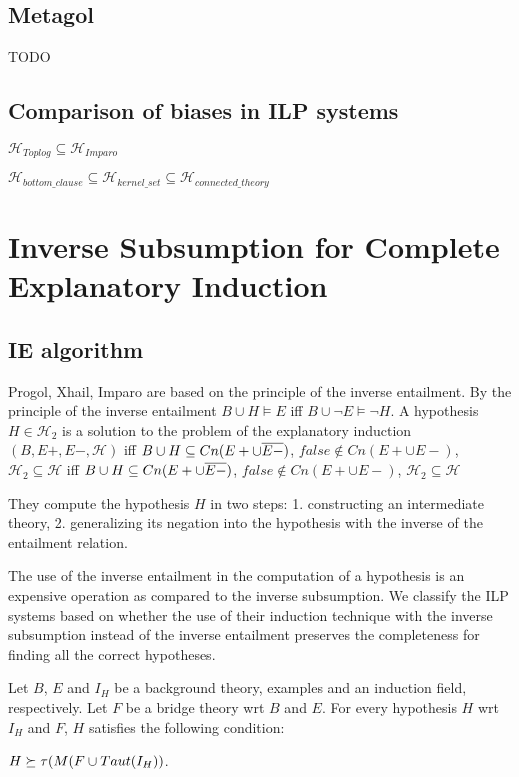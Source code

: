 \subsection{Metagol}
TODO


\subsection{Comparison of biases in ILP systems}
$\mathcal{H}_{Toplog} \subseteq \mathcal{H}_{Imparo}$

$\mathcal{H}_{bottom\_clause} \subseteq \mathcal{H}_{kernel\_set} \subseteq \mathcal{H}_{connected\_theory}$

\section{Inverse Subsumption for Complete Explanatory Induction}\cite{yamamoto2012inverse}

\subsection{IE algorithm\cite{yamamoto2012inverse}}
Progol, Xhail, Imparo are based on the principle of the inverse entailment. By the principle of the inverse entailment $B \cup H \models E$ iff
$B \cup \neg E \models \neg H$. A hypothesis $H \in \mathcal{H}_2$ is a solution to the problem of the explanatory induction $(B,E+,E-,\mathcal{H})$ iff
$B \cup H \subseteq Cn(E+ \cup \overline{E-})$,
 $false \not\in Cn(E+ \cup E-)$, $\mathcal{H}_2 \subseteq \mathcal{H}$
iff
$B \cup H \subseteq Cn(E+ \cup \overline{E-})$,
 $false \not\in Cn(E+ \cup E-)$, $\mathcal{H}_2 \subseteq \mathcal{H}$
 
They compute the hypothesis $H$ in two steps:
1. constructing an intermediate theory, 2. generalizing its negation into the hypothesis with the inverse of the entailment relation.

The use of the inverse entailment in the computation of a hypothesis is an expensive operation as compared to the inverse subsumption. We classify the ILP systems based on whether the use of their induction technique with the inverse subsumption instead of the inverse entailment preserves the completeness for finding all the correct hypotheses.

\begin{lemma}\label{yamamoto2012inverseLemma2}\cite{yamamoto2012inverse}
Let $B$, $E$ and $I_H$ be a background theory, examples and an induction field,
respectively. Let $F$ be a bridge theory wrt $B$ and $E$. For every hypothesis $H$ wrt $I_H$ and $F$, $H$ satisfies the following condition:

$H \succeq \tau(M(F \cup Taut(I_H))$.
\end{lemma}

